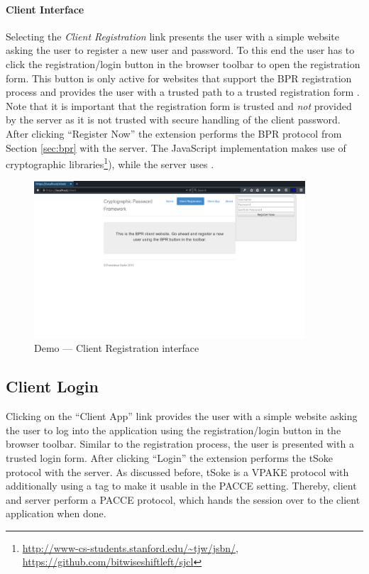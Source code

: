 \paragraph{Client Interface}
Selecting the \emph{Client Registration} link presents the user with a simple website asking the user to register a new user and password.
To this end the user has to click the registration/login button in the browser toolbar to open the registration form.
This button is only active for websites that support the \ac{BPR} registration process and provides the user with a trusted path to a trusted registration form \cite{}.
Note that it is important that the registration form is trusted and \emph{not} provided by the server as it is not trusted with secure handling of the client password.
After clicking ``Register Now'' the extension performs the \ac{BPR} protocol from Section \ref{sec:bpr} with the server.
The JavaScript implementation makes use of cryptographic libraries\footnote{\url{http://www-cs-students.stanford.edu/~tjw/jsbn/}, \url{https://github.com/bitwiseshiftleft/sjcl}}), while the server uses \cite{charm13}.

\begin{figure}[tbph]
\centering
\includegraphics[width=0.9\textwidth]{Figs/demo-register-popup.png}
\caption{Demo --- Client Registration interface}\label{fig:demo-register}
\end{figure}

\subsection{Client Login}
Clicking on the ``Client App'' link provides the user with a simple website asking the user to log into the application using the registration/login button in the browser toolbar.
Similar to the registration process, the user is presented with a trusted login form.
After clicking ``Login'' the extension performs the tSoke protocol with the server.
As discussed before, tSoke is a \ac{VPAKE} protocol with additionally using a tag to make it usable in the \ac{PACCE} setting.
Thereby, client and server perform a \ac{PACCE} protocol, which hands the session over to the client application when done.

